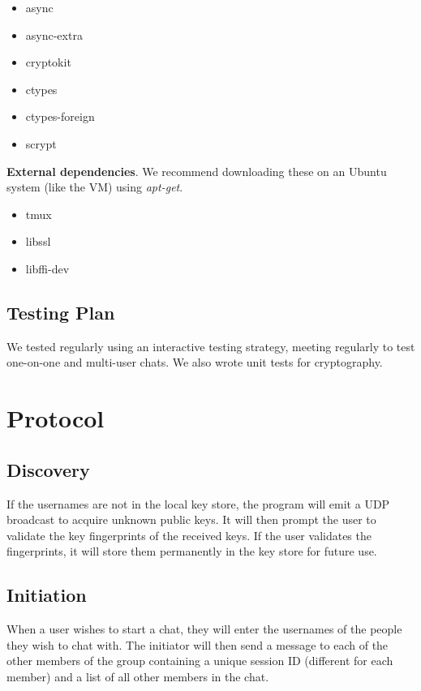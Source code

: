 \documentclass{scrartcl}
\begin{document}
\begin{itemize}
    \item async
    \item async-extra
    \item cryptokit
    \item ctypes
    \item ctypes-foreign
    \item scrypt
\end{itemize}

\textbf{External dependencies}. We recommend downloading these on an Ubuntu system (like the VM) using \textit{apt-get}.

\begin{itemize}
 \item tmux
 \item libssl
 \item libffi-dev
\end{itemize}

\subsection{Testing Plan}
We tested regularly using an interactive testing strategy, meeting regularly to test one-on-one and multi-user chats. We also wrote unit tests for cryptography.

\section{Protocol}

\subsection{Discovery}

If the usernames are not in the local key store, the program will emit a UDP broadcast to acquire unknown public keys. It will then prompt the user to validate the key fingerprints of the received keys. If the user validates the fingerprints, it will store them permanently in the key store for future use.

\subsection{Initiation}
When a user wishes to start a chat, they will enter the usernames of the people they wish to chat with. The initiator will then send a message to each of the other members of the group containing a unique session ID (different for each member) and a list of all other members in the chat.\\
\end{document}
